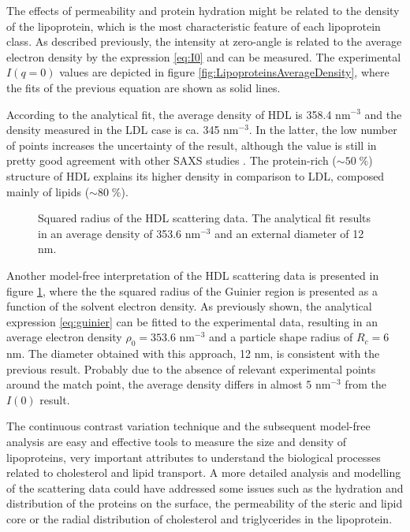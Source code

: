 The effects of permeability and protein hydration might be related to the density of the lipoprotein, which is the most characteristic feature of each lipoprotein class. As described previously, the intensity at zero-angle is related to the average electron density by the expression \ref{eq:I0} and can be measured. The experimental $I(q=0)$ values are depicted in figure \ref{fig:LipoproteinsAverageDensity}, where the fits of the previous equation are shown as solid lines. 

According to the analytical fit, the average density of HDL is 358.4 nm$^{-3}$ and the density measured in the LDL case is ca. 345 nm$^{-3}$. In the latter, the low number of points increases the uncertainty of the result, although the value is still in pretty good agreement with other SAXS studies \citep{tardieu_structure_1976,luzzati_structure_1979}. The protein-rich ($\sim 50 \; \% $) structure of HDL explains its higher density in comparison to LDL, composed mainly of lipids ($\sim 80 \; \% $). 

\begin{figure}
	\centering
		
		\caption[Squared radius of the HDL scattering data.]{Squared radius of the HDL scattering data. The analytical fit results in an average density of 353.6 nm$^{-3}$ and an external diameter of 12 nm.}
		\label{fig:HDLGuinierRadius}
\end{figure}

Another model-free interpretation of the HDL scattering data is presented in figure \ref{fig:HDLGuinierRadius}, where the the squared radius of the Guinier region is presented as a function of the solvent electron density. As previously shown, the analytical expression \ref{eq:guinier} can be fitted to the experimental data, resulting in an average electron density $\rho_0=353.6$ nm$^{-3}$ and a particle shape radius of $R_c=6$ nm. The diameter obtained with this approach, 12 nm, is consistent with the previous result. Probably due to the absence of relevant experimental points around the match point, the average density differs in almost 5 nm$^{-3}$ from the $I(0)$ result.

The continuous contrast variation technique and the subsequent model-free analysis are easy and effective tools to measure the size and density of lipoproteins, very important attributes to understand the biological processes related to cholesterol and lipid transport. A more detailed analysis and modelling of the scattering data could have addressed some issues such as the hydration and distribution of the proteins on the surface, the permeability of the steric and lipid core or the radial distribution of cholesterol and triglycerides in the lipoprotein.


